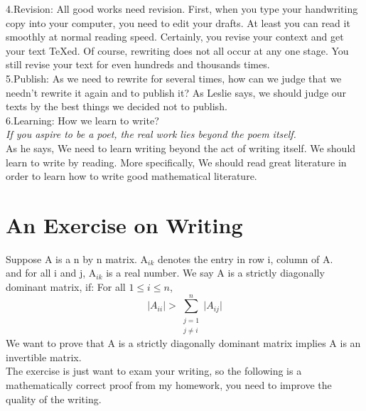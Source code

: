 \documentclass[]{article}
\begin{document}
	\noindent4.Revision: All good works need revision. First, when you type your handwriting copy into your computer, you need to edit your drafts. At least you can read it smoothly at normal reading speed. Certainly, you revise your context and get your text \TeX ed. Of course, rewriting does not all occur at any one stage. You still revise your text for even hundreds and thousands times.\\
	
	\noindent5.Publish: As we need to rewrite for several times, how can we judge that we needn't rewrite it again and to publish it? As Leslie says, we should judge our texts by the best things we decided not to publish.\\
	
	\noindent6.Learning: How we learn to write?\\
	\textit{If you aspire to be a poet, the real work lies beyond the poem itself.}\\
	As he says, We need to learn writing beyond the act of writing itself. We should learn to write by reading. More specifically, We should read great literature in order to learn how to write good mathematical literature. \\
	
	\section{An Exercise on Writing}
	\indent Suppose A is a n by n matrix. A$_{ik}$ denotes the entry in row i, column of A.\\ and
	for all i and j, A$_{ik}$ is a real number. We say A is a strictly diagonally dominant matrix, if: {\large For all \(1\leq i\leq n\),
		\[
		\vert A_{ii}\vert>\sum_{\substack {j=1 \\ j\neq i}}^{n}\vert A_{ij}\vert
		\]}
	\indent We want to prove that A is a strictly diagonally dominant matrix implies A is an invertible matrix.\\
	The exercise is just want to exam your writing, so the following is a mathematically correct proof from my homework, you need to improve the quality of the writing.\\
	
\end{document}
